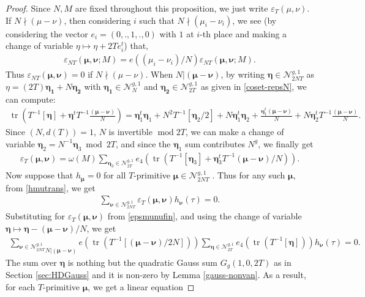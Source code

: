 \documentclass[11pt]{amsart}
\numberwithin{equation}{section}
\newcommand{\mc}{\mathcal}
\DeclareMathOperator{\tr}{tr}
\renewcommand*{\mod}{\operatorname{mod}}
\newcommand{\sumn}{\sum \nolimits}
\begin{document}
\begin{proof}
Since $N, M$ are fixed throughout this proposition, we just write $\varepsilon_T(\mu, \nu)$. If $N\nmid(\mu-\nu)$, then considering $i$ such that $N\nmid (\mu_i-\nu_i)$, we see  (by considering the vector $e_i=(0,.,1,.,0)$ with $1$ at $i$-th place and making a change of variable $\eta\mapsto \eta+2Te_i^t$) that,
\begin{align}
 \varepsilon_{NT}(\bm\mu, \bm\nu;M)= e((\mu_i-\nu_i)/N)  \varepsilon_{NT}(\bm\mu, \bm\nu;M).   
\end{align}
Thus $\varepsilon_{NT}(\bm\mu, \bm\nu)=0$ if $N\nmid(\mu-\nu)$.  When $N|(\bm\mu-\bm\nu)$, by writing $\bm\eta\in \mc N_{2NT}^{g,1}$ as $\eta=(2T) \bm{\eta_1}+N\bm{\eta_2}$ with $\bm{\eta_1}\in \mc N_{N}^{g,1}$ and $\bm{\eta_2}\in \mc N_{2T}^{g,1}$ as given in \eqref{coset-repsN}, we can compute:
\begin{align}
\tr\left(T^{-1}[\bm\eta]+\bm\eta^tT^{-1}\frac{(\bm\mu-\bm\nu)}{N} \right)= \bm\eta_1^t\bm\eta_1+N^2 T^{-1}[\bm\eta_2/2]+N\bm\eta_1^t\bm\eta_2+ \frac{\bm\eta_1^t(\bm\mu-\bm\nu)}{N}+N\bm\eta_2^tT^{-1}\frac{(\bm\mu-\bm\nu)}{N}. 
\end{align}
Since $(N, d(T))=1$, $N$ is invertible $\mod 2T$,  we can make a change of variable $\bm\eta_2= N^{-1}\bm\eta_3 \bmod 2T$, and since the $\bm\eta_1$ sum contributes $N^g$, we finally get
\begin{align}\label{epsmunufin}
    \varepsilon_T(\bm\mu, \bm\nu)= \omega(M)\sumn_{\bm\eta_3\in \mc N_{2T}^{g,1}} e_4\left(\tr(T^{-1}[\bm\eta_3]+\bm\eta_3^tT^{-1}(\bm\mu-\bm\nu)/N )\right).
\end{align}
Now suppose that $h_{\bm\mu}=0$ for all $T$-primitive $\bm\mu\in \mc N_{2NT}^{g,1} $ . Thus for any such $\bm\mu$, from \eqref{hmutrans}, we get
\begin{align}
\sumn_{\bm\nu\in \mc N_{2NT}^{g,1}}\varepsilon_T(\bm\mu, \bm\nu) h_{\bm\nu}(\tau)=0.
\end{align}
Substituting for $\varepsilon_T(\bm\mu, \bm\nu)$ from \eqref{epsmunufin}, and using the change of variable $\bm\eta\mapsto \bm\eta-(\bm\mu-\bm\nu)/N$, we get
\begin{align}
\underset{N|(\bm\mu-\bm\nu)}{\sum_{\bm\nu\in \mc N_{2NT}^{g,1}}}e\left(\tr(T^{-1}[(\bm\mu-\bm\nu)/2N])\right)\sum_{\bm\eta\in \mc N_{2T}^{g,1}} e_4\left(\tr(T^{-1}[\bm\eta])\right) h_{\bm\nu}(\tau)=0.
\end{align}
The sum over $\bm\eta$ is nothing but the quadratic Gauss sum $G_g(1,0, 2T)$ as in Section \ref{sec:HDGauss}
and it is non-zero by Lemma \ref{gauss-nonvan}. As a result, for each $T$-primitive $\bm\mu$, we get a linear equation

\end{proof}
\end{document}
